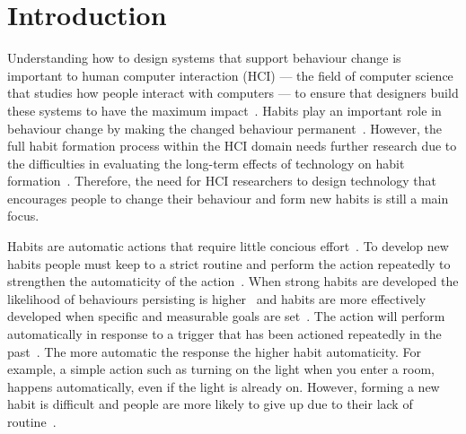 
\section{Introduction}
Understanding how to design systems that support behaviour change is important to human computer interaction (HCI) --- the field of computer science that studies how people interact with computers --- to ensure that designers build these systems to have the maximum impact~\cite{article_evaluate_tech_health_behaviour_change}. Habits play an important role in behaviour change by making the changed behaviour permanent~\cite{article_promoting_habit_formation}. However, the full habit formation process within the HCI domain needs further research due to the difficulties in evaluating the long-term effects of technology on habit formation~\cite{article_evaluate_tech_health_behaviour_change}. Therefore, the need for HCI researchers to design technology that encourages people to change their behaviour and form new habits is still a main focus.

Habits are automatic actions that require little concious effort~\cite{article_the_habitual_consumer}. To develop new habits people must keep to a strict routine and perform the action repeatedly to strengthen the automaticity of the action~\cite{article_promoting_habit_formation}. When strong habits are developed the likelihood of behaviours persisting is higher~\cite{putting_habit_into_practice} and habits are more effectively developed when specific and measurable goals are set~\cite{habits_better_when_have_specific_and_measurable_goals}. The action will perform automatically in response to a trigger that has been actioned repeatedly in the past~\cite{article_the_habitual_consumer}. The more automatic the response the higher habit automaticity. For example, a simple action such as turning on the light when you enter a room, happens automatically, even if the light is already on. However, forming a new habit is difficult and people are more likely to give up due to their lack of routine~\cite{article_promoting_habit_formation, article_the_habitual_consumer}.

